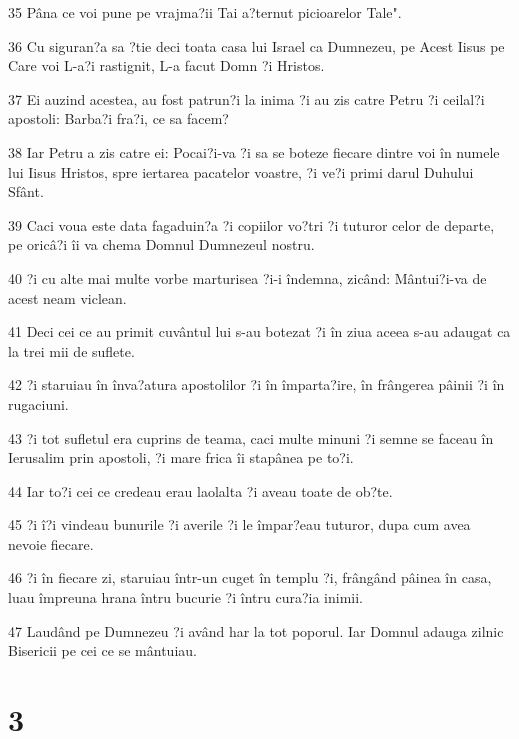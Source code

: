 \par 35 Pâna ce voi pune pe vrajma?ii Tai a?ternut picioarelor Tale".
\par 36 Cu siguran?a sa ?tie deci toata casa lui Israel ca Dumnezeu, pe Acest Iisus pe Care voi L-a?i rastignit, L-a facut Domn ?i Hristos.
\par 37 Ei auzind acestea, au fost patrun?i la inima ?i au zis catre Petru ?i ceilal?i apostoli: Barba?i fra?i, ce sa facem?
\par 38 Iar Petru a zis catre ei: Pocai?i-va ?i sa se boteze fiecare dintre voi în numele lui Iisus Hristos, spre iertarea pacatelor voastre, ?i ve?i primi darul Duhului Sfânt.
\par 39 Caci voua este data fagaduin?a ?i copiilor vo?tri ?i tuturor celor de departe, pe oricâ?i îi va chema Domnul Dumnezeul nostru.
\par 40 ?i cu alte mai multe vorbe marturisea ?i-i îndemna, zicând: Mântui?i-va de acest neam viclean.
\par 41 Deci cei ce au primit cuvântul lui s-au botezat ?i în ziua aceea s-au adaugat ca la trei mii de suflete.
\par 42 ?i staruiau în înva?atura apostolilor ?i în împarta?ire, în frângerea pâinii ?i în rugaciuni.
\par 43 ?i tot sufletul era cuprins de teama, caci multe minuni ?i semne se faceau în Ierusalim prin apostoli, ?i mare frica îi stapânea pe to?i.
\par 44 Iar to?i cei ce credeau erau laolalta ?i aveau toate de ob?te.
\par 45 ?i î?i vindeau bunurile ?i averile ?i le împar?eau tuturor, dupa cum avea nevoie fiecare.
\par 46 ?i în fiecare zi, staruiau într-un cuget în templu ?i, frângând pâinea în casa, luau împreuna hrana întru bucurie ?i întru cura?ia inimii.
\par 47 Laudând pe Dumnezeu ?i având har la tot poporul. Iar Domnul adauga zilnic Bisericii pe cei ce se mântuiau.

\chapter{3}

